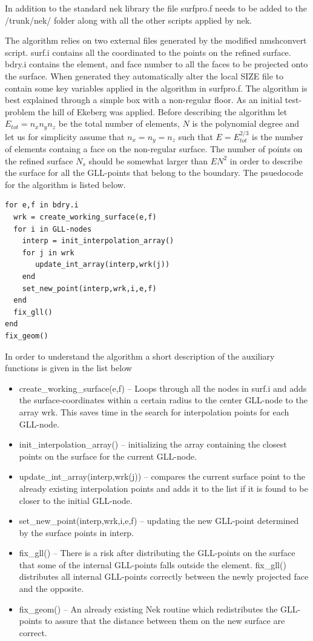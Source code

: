In addition to the standard nek library the file surfpro.f needs to be added to 
the /trunk/nek/ folder along with all the other scripts applied by nek.

The algorithm relies on two external files generated by the modified nmshconvert script.
surf.i contains all the coordinated to the points on the refined surface. 
bdry.i contains the element, and face number to all the faces to be projected onto the surface.
When generated they automatically alter the local SIZE file to contain some key variables 
applied in the algorithm in surfpro.f.
The algorithm is best explained through a simple box with a non-regular floor. 
As an initial test-problem the hill of Ekeberg was applied. 
Before describing the algorithm let $E_{tot} = n_xn_yn_z$  be the total number of elements, 
$N$ is the polynomial degree and let us for simplicity assume that $n_x=n_y=n_z$ such that 
$E= E_{tot}^{2/3}$ is the number of elements containg a face on the non-regular surface.
The number of points on the refined surface $N_s$ should be somewhat larger than $EN^2$ in 
order to describe the surface for all the GLL-points that belong to the boundary. 
The psuedocode for the algorithm is listed below.
%
\begingroup
\fontsize{12pt}{14pt}
\begin{lstlisting}[escapechar=|]
for e,f in bdry.i
  wrk = create_working_surface(e,f)
  for i in GLL-nodes
    interp = init_interpolation_array() 
    for j in wrk
       update_int_array(interp,wrk(j))
    end
    set_new_point(interp,wrk,i,e,f)
  end
  fix_gll()
end
fix_geom()
\end{lstlisting}
\endgroup
% 
In order to understand the algorithm a short description of the auxiliary functions is 
given in the list below
\begin{itemize}
    \item create\_working\_surface(e,f) -- Loops through all the nodes in surf.i and adds the 
        surface-coordinates within a certain radius to the center GLL-node to the array wrk.
        This saves time in the search for interpolation points for each GLL-node.
    \item init\_interpolation\_array() -- initializing the array containing the closest 
        points on the surface for the current GLL-node. 
    \item update\_int\_array(interp,wrk(j)) -- compares the current surface point to the 
        already existing interpolation points and adds it to the list if it is found to 
        be closer to the initial GLL-node.
    \item set\_new\_point(interp,wrk,i,e,f) -- updating the new GLL-point determined by the 
        surface points in interp.
    \item fix\_gll() -- There is a risk after distributing the GLL-points on the surface that
        some of the internal GLL-points falls outside the element. fix\_gll() distributes 
        all internal GLL-points correctly between the newly projected face and the opposite.
    \item fix\_geom() -- An already existing Nek routine which redistributes the GLL-points to 
        assure that the distance between them on the new surface are correct.
\end{itemize}

